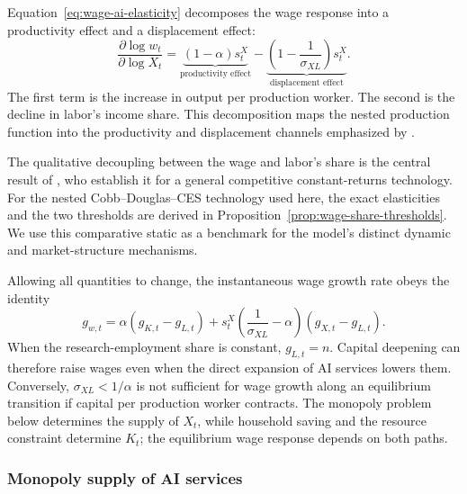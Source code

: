 Equation~\eqref{eq:wage-ai-elasticity} decomposes the wage response into a
productivity effect and a displacement effect:
\begin{equation}
    \frac{\partial\log w_t}{\partial\log X_t}
    =
    \underbrace{(1-\alpha)s^X_t}_{\text{productivity effect}}
    -
    \underbrace{\left(1-\frac{1}{\sigma_{XL}}\right)s^X_t}
    _{\text{displacement effect}}.
    \label{eq:wage-decomposition}
\end{equation}
The first term is the increase in output per production worker. The second is the
decline in labor's income share. This decomposition maps the nested production
function into the productivity and displacement channels emphasized by
\citet{acemoglurestrepo2019}.

The qualitative decoupling between the wage and labor's share is the central result
of \citet[Theorem~1]{autorkausik2026}, who establish it for a general competitive
constant-returns technology. For the nested Cobb--Douglas--CES technology used
here, the exact elasticities and the two thresholds are derived in
Proposition~\ref{prop:wage-share-thresholds}. We use this
comparative static as a benchmark for the model's distinct dynamic and
market-structure mechanisms.

Allowing all quantities to change, the instantaneous wage growth rate obeys the
identity
\begin{equation}
    g_{w,t}
    =
    \alpha\left(g_{K,t}-g_{L,t}\right)
    +
    s^X_t\left(\frac{1}{\sigma_{XL}}-\alpha\right)
    \left(g_{X,t}-g_{L,t}\right).
    \label{eq:dynamic-wage-decomposition}
\end{equation}
When the research-employment share is constant, $g_{L,t}=n$. Capital deepening can
therefore raise wages even when the direct expansion of AI services lowers them.
Conversely, $\sigma_{XL}<1/\alpha$ is not sufficient for wage growth along an equilibrium
transition if capital per production worker contracts. The monopoly problem below
determines the supply of $X_t$, while household saving and the resource constraint
determine $K_t$; the equilibrium wage response depends on both paths.

\subsubsection{Monopoly supply of AI services}

